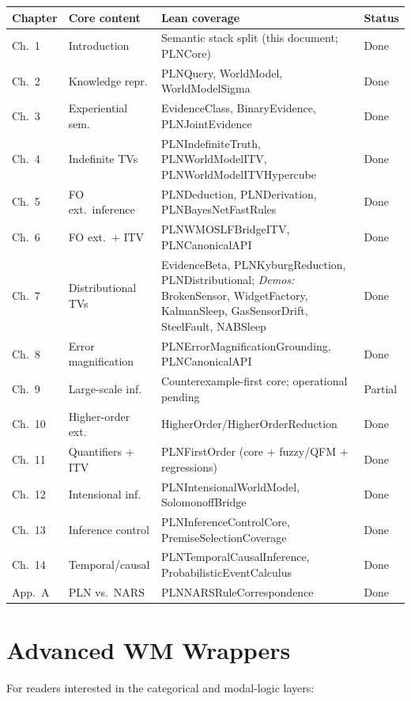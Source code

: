 \documentclass[11pt,openany]{report}
\begin{document}
\begin{longtable}{p{}p{}p{}p{}}
\textbf{Chapter} & \textbf{Core content} & \textbf{Lean coverage} & \textbf{Status} \\
\hline
Ch.\ 1 & Introduction & Semantic stack split (this document; PLNCore) & Done \\
Ch.\ 2 & Knowledge repr. & PLNQuery, WorldModel, WorldModelSigma & Done \\
Ch.\ 3 & Experiential sem. & EvidenceClass, BinaryEvidence, PLNJointEvidence & Done \\
Ch.\ 4 & Indefinite TVs & PLNIndefiniteTruth, PLNWorldModelITV, PLNWorldModelITVHypercube & Done \\
Ch.\ 5 & FO ext.\ inference & PLNDeduction, PLNDerivation, PLNBayesNetFastRules & Done \\
Ch.\ 6 & FO ext.\ + ITV & PLNWMOSLFBridgeITV, PLNCanonicalAPI & Done \\
Ch.\ 7 & Distributional TVs & EvidenceBeta, PLNKyburgReduction, PLNDistributional; \emph{Demos:} BrokenSensor, WidgetFactory, KalmanSleep, GasSensorDrift, SteelFault, NABSleep & Done \\
Ch.\ 8 & Error magnification & PLNErrorMagnificationGrounding, PLNCanonicalAPI & Done \\
Ch.\ 9 & Large-scale inf. & Counterexample-first core; operational pending & Partial \\
Ch.\ 10 & Higher-order ext. & HigherOrder/HigherOrderReduction & Done \\
Ch.\ 11 & Quantifiers + ITV & PLNFirstOrder (core + fuzzy/QFM + regressions) & Done \\
Ch.\ 12 & Intensional inf. & PLNIntensionalWorldModel, SolomonoffBridge & Done \\
Ch.\ 13 & Inference control & PLNInferenceControlCore, PremiseSelectionCoverage & Done \\
Ch.\ 14 & Temporal/causal & PLNTemporalCausalInference, ProbabilisticEventCalculus & Done \\
App.\ A & PLN vs.\ NARS & PLNNARSRuleCorrespondence & Done \\
\hline
\end{longtable}


\chapter{Advanced WM Wrappers}
\label{app:advanced-wm}

For readers interested in the categorical and modal-logic layers:
\end{document}
